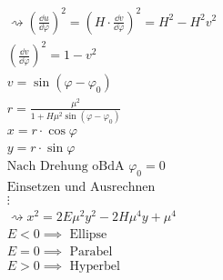 \begin{bsp*}[note = Zwei Körper Problem]
\begin{gather*}
		\rightsquigarrow \left( \frac{\dd u}{\dd \varphi} \right)^2 = \left( H \cdot \frac{\dd v}{\dd \varphi} \right)^2 = H^2 - H^2 v^2 \\
		\left( \frac{\dd v}{\dd \varphi} \right)^2 = 1 - v^2 \\
		v = \sin( \varphi - \varphi_0 ) \\
		r = \frac{\mu^2}{1 + H\mu^2 \sin( \varphi - \varphi_0 ) }  \\
		x = r \cdot \cos \varphi \\
		y = r \cdot \sin \varphi \\
		\text{Nach Drehung oBdA } \varphi_0 = 0 \\
		\text{Einsetzen und Ausrechnen} \\
		\vdots \\
		\rightsquigarrow x^2 = 2E \mu^2 y^2 - 2H \mu^4 y + \mu^4 \\
		E < 0 \implies \text{ Ellipse} \\
		E = 0 \implies \text{ Parabel} \\
		E > 0 \implies \text{ Hyperbel}
	\end{gather*}
\end{bsp*}

